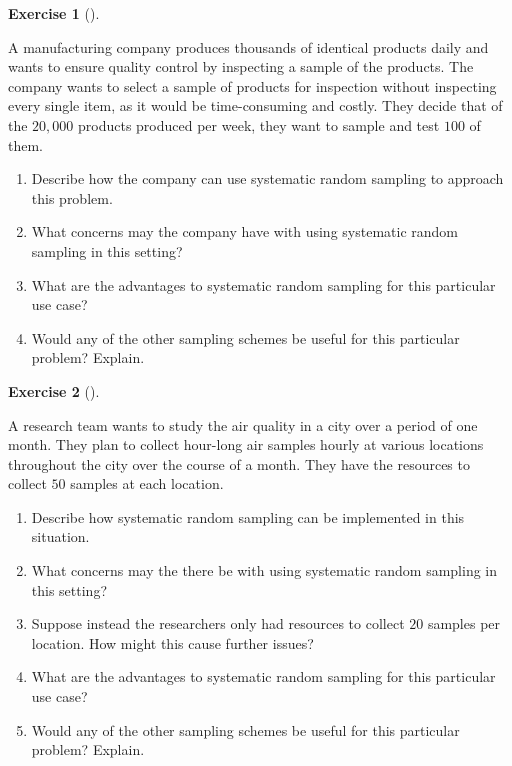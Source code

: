 \documentclass[
  letterpaper,
  DIV=11,
  numbers=noendperiod]{scrreprt}
\providecommand{\tightlist}{%
  \setlength{\itemsep}{0pt}\setlength{\parskip}{0pt}}\usepackage{longtable,booktabs,array}
\theoremstyle{definition}
\newtheorem{exercise}{Exercise}[chapter]
\theoremstyle{definition}
\theoremstyle{definition}
\theoremstyle{remark}
\begin{document}
\begin{exercise}[]\protect\hypertarget{exr-10.10}{}\label{exr-10.10}

A manufacturing company produces thousands of identical products daily
and wants to ensure quality control by inspecting a sample of the
products. The company wants to select a sample of products for
inspection without inspecting every single item, as it would be
time-consuming and costly. They decide that of the \(20,000\) products
produced per week, they want to sample and test \(100\) of them.

\begin{enumerate}
\def\labelenumi{\alph{enumi}.}
\tightlist
\item
  Describe how the company can use systematic random sampling to
  approach this problem.
\item
  What concerns may the company have with using systematic random
  sampling in this setting?
\item
  What are the advantages to systematic random sampling for this
  particular use case?
\item
  Would any of the other sampling schemes be useful for this particular
  problem? Explain.
\end{enumerate}

\end{exercise}

\begin{exercise}[]\protect\hypertarget{exr-10.11}{}\label{exr-10.11}

A research team wants to study the air quality in a city over a period
of one month. They plan to collect hour-long air samples hourly at
various locations throughout the city over the course of a month. They
have the resources to collect \(50\) samples at each location.

\begin{enumerate}
\def\labelenumi{\alph{enumi}.}
\tightlist
\item
  Describe how systematic random sampling can be implemented in this
  situation.
\item
  What concerns may the there be with using systematic random sampling
  in this setting?
\item
  Suppose instead the researchers only had resources to collect \(20\)
  samples per location. How might this cause further issues?
\item
  What are the advantages to systematic random sampling for this
  particular use case?
\item
  Would any of the other sampling schemes be useful for this particular
  problem? Explain.
\end{enumerate}

\end{exercise}
\end{document}
